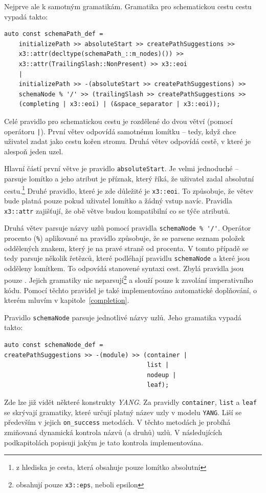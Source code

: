 \documentclass[thesis=B,czech,hidelinks]{FITthesis}[2019/03/06]
\begin{document}
Nejprve ale k samotným gramatikám. Gramatika pro schematickou cestu cestu vypadá takto:
\begin{verbatim}
auto const schemaPath_def =
    initializePath >> absoluteStart >> createPathSuggestions >>
    x3::attr(decltype(schemaPath_::m_nodes)()) >>
    x3::attr(TrailingSlash::NonPresent) >> x3::eoi
    |
    initializePath >> -(absoluteStart >> createPathSuggestions) >>
    schemaNode % '/' >> (trailingSlash >> createPathSuggestions >>
    (completing | x3::eoi) | (&space_separator | x3::eoi));

\end{verbatim}
Celé pravidlo pro schematickou cestu je rozdělené do dvou větví (pomocí operátoru \texttt{|}). První větev odpovídá samotnému lomítku -- tedy, když chce uživatel zadat jako cestu kořen stromu. Druhá větev odpovídá cestě, v které je alespoň jeden uzel.

Hlavní částí první větve je pravidlo \texttt{absoluteStart}. Je velmi jednoduché -- parsuje lomítko a jeho atribut je příznak, který říká, že uživatel zadal absolutní cestu.\footnote{z hlediska  je cesta, která obsahuje pouze lomítko absolutní} Druhé pravidlo, které je zde důležité je \texttt{x3::eoi}. To způsobuje, že větev bude platná pouze pokud uživatel lomítko a žádný vstup navíc. Pravidla \texttt{x3::attr} zajišťují, že obě větve budou kompatibilní co se týče atributů.

Druhá větev parsuje názvy uzlů pomocí pravidla \verb¨schemaNode % '/'¨. Operátor procento (\texttt{\%}) aplikované na pravidlo způsobuje, že se parsene seznam položek oddělených znakem, který je na pravé straně od procenta. V tomto případě se tedy parsuje několik řetězců, které podléhají pravidlu \texttt{schemaNode} a které jsou odděleny lomítkem. To odpovídá stanovené syntaxi cest. Zbylá pravidla jsou pouze . Jejich gramatiky nic neparsují\footnote{obsahují pouze \texttt{x3::eps}, neboli epsilon} a slouží pouze k zavolání imperativního kódu. Pomocí těchto pravidel je také implementováno automatické doplňování, o kterém mluvím v kapitole~\ref{completion}.

Pravidlo \texttt{schemaNode} parsuje jednotlivé názvy uzlů. Jeho gramatika vypadá takto:
\begin{verbatim}
auto const schemaNode_def =
createPathSuggestions >> -(module) >> (container |
                                       list |
                                       nodeup |
                                       leaf);
\end{verbatim}
Zde lze již vidět některé konstrukty \textit{YANG}. Za pravidly \texttt{container}, \texttt{list} a \texttt{leaf} se skrývají gramatiky, které určují platný název uzly v modelu \texttt{YANG}. Liší se především v jejich \verb¨on_success¨ metodách. V těchto metodách je probíhá zmiňovaná dynamická kontrola názvů (a druhů) uzlů. V následujících podkapitolách popisuji jakým je tato kontrola implementována.
\end{document}
